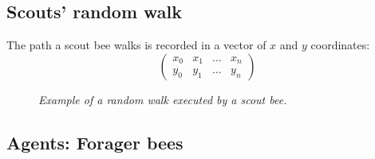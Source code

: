 \documentclass[
	paper=128mm:96mm,
	fontsize=11pt,
	pagesize,
	parskip=half-,
]{scrartcl}
\theoremstyle{mythmstyle} %
\begin{document}
\subsection*{Scouts' random walk}
	The path a scout bee walks is recorded in a vector of $x$ and $y$ coordinates:
	\[\begin{pmatrix}
		x_0 & x_1 & \ldots & x_n \\ y_0 & y_1 & \ldots & y_n
	\end{pmatrix}\]
	\begin{figure}[H]
		\centering
		\caption{\textit{Example of a random walk executed by a scout bee.}}
	\end{figure}
	\clearpage
\subsection*{Agents: Forager bees}
	
	\clearpage
\end{document}
